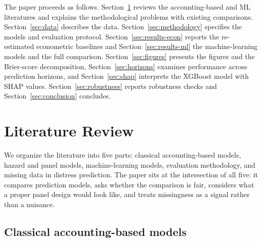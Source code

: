 \documentclass[12pt,a4paper]{article}
\begin{document}
The paper proceeds as follows. Section~\ref{sec:lit} reviews the
accounting-based and ML literatures and explains the methodological problems
with existing comparisons. Section~\ref{sec:data} describes the data.
Section~\ref{sec:methodology} specifies the models and evaluation protocol.
Section~\ref{sec:results-econ} reports the re-estimated econometric baselines
and Section~\ref{sec:results-ml} the machine-learning models and the full
comparison. Section~\ref{sec:figures} presents the figures and the
Brier-score decomposition, Section~\ref{sec:horizons} examines performance
across prediction horizons, and Section~\ref{sec:shap} interprets the XGBoost
model with SHAP values. Section~\ref{sec:robustness} reports robustness
checks and Section~\ref{sec:conclusion} concludes.

\clearpage
\section{Literature Review}\label{sec:lit}

We organize the literature into five parts: classical accounting-based models,
hazard and panel models, machine-learning models, evaluation methodology, and
missing data in distress prediction. The paper sits at the intersection of all
five: it compares prediction models, asks whether the comparison is fair,
considers what a proper panel design would look like, and treats missingness
as a signal rather than a nuisance.

\subsection{Classical accounting-based models}
\end{document}
